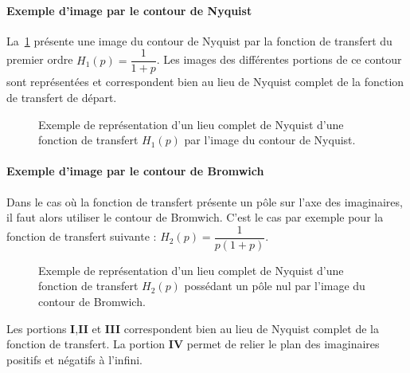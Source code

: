 \paragraph{Exemple d'image par le contour de Nyquist}
La~\cref{fig-nyquist_complet_image_exemple1} présente une image du contour
de Nyquist par la fonction de transfert du premier ordre 
$H_1(p)=\dfrac{1}{1+p}$. Les images des différentes portions de ce contour 
sont représentées et correspondent bien au lieu de Nyquist complet de la 
fonction de transfert de départ.
\begin{figure}[!h]
    \centering
    
    \caption{Exemple de représentation d'un lieu complet de Nyquist d'une 
             fonction de transfert $H_1(p)$ par l'image du contour de 
             Nyquist. \label{fig-nyquist_complet_image_exemple1}}
\end{figure}
\paragraph{Exemple d'image par le contour de Bromwich}
Dans le cas où la fonction de transfert présente un pôle sur l'axe des 
imaginaires, il faut alors utiliser le contour de Bromwich. C'est le cas
par exemple pour la fonction de transfert suivante : $H_2(p)=\dfrac{1}{p(1+p)}$.
\begin{figure}[!h]
    \centering
    
    \caption{Exemple de représentation d'un lieu complet de Nyquist 
             d'une fonction de transfert $H_2(p)$ possédant un pôle nul par 
             l'image du contour de Bromwich. 
    \label{fig-bromwich_complet_image_exemple1} }
\end{figure}
Les portions \textbf{I},\textbf{II} et \textbf{III} correspondent bien au lieu
de Nyquist complet de la fonction de transfert. La portion \textbf{IV} permet 
de relier le plan des imaginaires positifs et négatifs à l'infini.
\clearpage

\captionsetup{width=0.9\linewidth}
